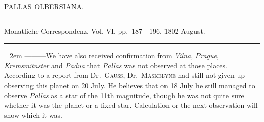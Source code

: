%
\bigskip{}
\begin{center}
PALLAS OLBERSIANA.\par
\medskip\hrule\medskip
Monatliche Correspondenz. Vol. VI. pp.\ 187—196. 1802 August.\par
\medskip\hrule
\end{center}\medskip
\begingroup\emergencystretch=2em
—\quad —\quad —\quad We have also received confirmation from \textit{Vilna}, \textit{Prague}, \textit{Kremsmünster} and \textit{Padua} that \textit{Pallas} was not observed at those places. According to a report from Dr.\ \textsc{Gauss}, Dr.\ \textsc{Maskelyne} had still not given up observing this planet on 20 July. He believes that on 18 July he still managed to observe \textit{Pallas} as a star of the 11th magnitude, though he was not quite sure whether it was the planet or a fixed star. Calculation or the next observation will show which it was.\par\endgroup

